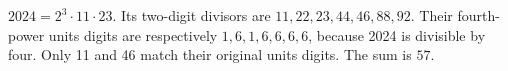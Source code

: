 $2024=2^3\cdot11\cdot23$. Its two-digit divisors are $11,22,23,44,46,88,92$. Their fourth-power units digits are respectively $1,6,1,6,6,6,6$, because 2024 is divisible by four. Only 11 and 46 match their original units digits. The sum is $\boxed{57}$.
